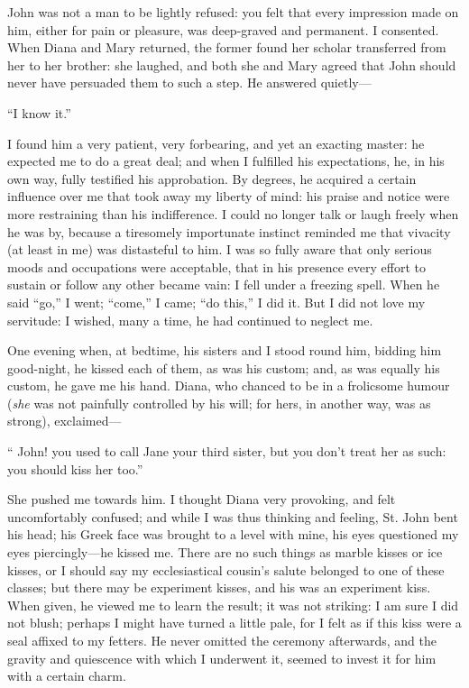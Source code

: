 \St{} John was not a man to be lightly refused: you felt that every
impression made on him, either for pain or pleasure, was deep-graved and
permanent. I consented. When Diana and Mary returned, the former found
her scholar transferred from her to her brother: she laughed, and both
she and Mary agreed that \St{} John should never have persuaded them to
such a step. He answered quietly---

\enquote{I know it.}

I found him a very patient, very forbearing, and yet an exacting master:
he expected me to do a great deal; and when I fulfilled his
expectations, he, in his own way, fully testified his approbation. By
degrees, he acquired a certain influence over me that took away my
liberty of mind: his praise and notice were more restraining than his
indifference. I could no longer talk or laugh freely when he was by,
because a tiresomely importunate instinct reminded me that vivacity (at
least in me) was distasteful to him. I was so fully aware that only
serious moods and occupations were acceptable, that in his presence
every effort to sustain or follow any other became vain: I fell under a
freezing spell. When he said \enquote{go,} I went; \enquote{come,} I
came; \enquote{do this,} I did it. But I did not love my servitude: I
wished, many a time, he had continued to neglect me.

One evening when, at bedtime, his sisters and I stood round him, bidding
him good-night, he kissed each of them, as was his custom; and, as was
equally his custom, he gave me his hand. Diana, who chanced to be in a
frolicsome humour (\emph{she} was not painfully controlled by his will;
for hers, in another way, was as strong), exclaimed---

\enquote{\St{} John! you used to call Jane your third sister, but you
	don't treat her as such: you should kiss her too.}

She pushed me towards him. I thought Diana very provoking, and felt
uncomfortably confused; and while I was thus thinking and feeling, St.
John bent his head; his Greek face was brought to a level with mine, his
eyes questioned my eyes piercingly---he kissed me. There are no such
things as marble kisses or ice kisses, or I should say my ecclesiastical
cousin's salute belonged to one of these classes; but there may be
experiment kisses, and his was an experiment kiss. When given, he
viewed me to learn the result; it was not striking: I am sure I did not
blush; perhaps I might have turned a little pale, for I felt as if this
kiss were a seal affixed to my fetters. He never omitted the ceremony
afterwards, and the gravity and quiescence with which I underwent it,
seemed to invest it for him with a certain charm.

